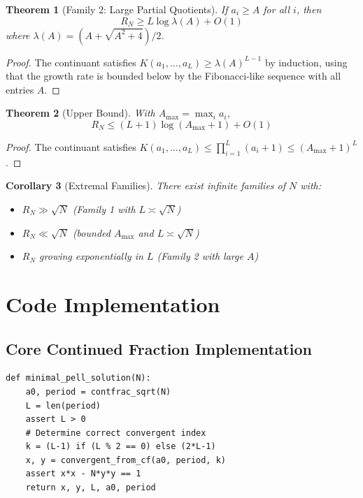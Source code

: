 \documentclass[12pt]{article}
\newtheorem{theorem}{Theorem}
\newtheorem{corollary}[theorem]{Corollary}
\begin{document}
\begin{theorem}[Family 2: Large Partial Quotients]
If $a_i \geq A$ for all $i$, then
\[
R_N \geq L\log\lambda(A) + O(1)
\]
where $\lambda(A) = (A + \sqrt{A^2+4})/2$.
\end{theorem}

\begin{proof}
The continuant satisfies $K(a_1,\dots,a_L) \geq \lambda(A)^{L-1}$ by induction, using that the growth rate is bounded below by the Fibonacci-like sequence with all entries $A$.
\end{proof}

\begin{theorem}[Upper Bound]
With $A_{\max} = \max_i a_i$,
\[
R_N \leq (L+1)\log(A_{\max}+1) + O(1)
\]
\end{theorem}

\begin{proof}
The continuant satisfies $K(a_1,\dots,a_L) \leq \prod_{i=1}^L (a_i+1) \leq (A_{\max}+1)^L$.
\end{proof}

\begin{corollary}[Extremal Families]
There exist infinite families of $N$ with:
\begin{itemize}
\item $R_N \gg \sqrt{N}$ (Family 1 with $L \asymp \sqrt{N}$)
\item $R_N \ll \sqrt{N}$ (bounded $A_{\max}$ and $L \asymp \sqrt{N}$)
\item $R_N$ growing exponentially in $L$ (Family 2 with large $A$)
\end{itemize}
\end{corollary}

\section{Code Implementation}

\subsection{Core Continued Fraction Implementation}

\begin{lstlisting}[caption=Continued Fraction for Pell Solution]
def minimal_pell_solution(N):
    a0, period = contfrac_sqrt(N)
    L = len(period)
    assert L > 0
    # Determine correct convergent index
    k = (L-1) if (L % 2 == 0) else (2*L-1)
    x, y = convergent_from_cf(a0, period, k)
    assert x*x - N*y*y == 1
    return x, y, L, a0, period
\end{lstlisting}
\end{document}
